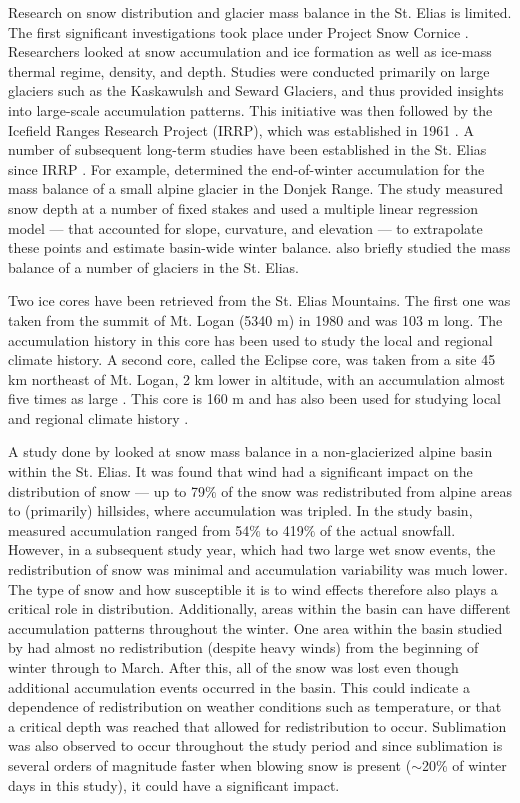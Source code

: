 \documentclass{sfuthesis}
\begin{document}
Research on snow distribution and glacier mass balance in the St. Elias is limited. The first significant investigations took place under Project Snow Cornice \citep{Wood1948}. Researchers looked at snow accumulation and ice formation as well as ice-mass thermal regime, density, and depth. Studies were conducted primarily on large glaciers such as the Kaskawulsh and Seward Glaciers, and thus provided insights into large-scale accumulation patterns. This initiative was then followed by the Icefield Ranges Research Project (IRRP), which was established in 1961 \citep{Danby2003}. A number of subsequent long-term studies have been established in the St. Elias since IRRP \citep[e.g.][]{Clarke1984, Paoli2009}. For example, \cite{Wheler2014} determined the end-of-winter accumulation for the mass balance of a small alpine glacier in the Donjek Range. The study measured snow depth at a number of fixed stakes and used a multiple linear regression model --- that accounted for slope, curvature, and elevation --- to extrapolate these points and estimate basin-wide winter balance. \cite{Arendt2008} also briefly studied the mass balance of a number of glaciers in the St. Elias.

Two ice cores have been retrieved from the St. Elias Mountains. The first one was taken from the summit of Mt. Logan (5340 m) in 1980 and was 103 m long. The accumulation history in this core has been used to study the local \citep{Holdsworth1991} and regional \citep{Moore2002} climate history. A second core, called the Eclipse core, was taken from a site 45 km northeast of Mt. Logan, 2 km lower in altitude, with an accumulation almost five times as large \citep{Wake2002}. This core is 160 m and has also been used for studying local and regional climate history \citep{Wake2002}. 

A study done by \cite{Pomeroy1999} looked at snow mass balance in a non-glacierized alpine basin within the St. Elias. It was found that wind had a significant impact on the distribution of snow --- up to 79$\%$ of the snow was redistributed from alpine areas to (primarily) hillsides, where accumulation was tripled. In the study basin, measured accumulation ranged from 54$\%$ to 419$\%$ of the actual snowfall. However, in a subsequent study year, which had two large wet snow events, the redistribution of snow was minimal and accumulation variability was much lower. The type of snow and how susceptible it is to wind effects therefore also plays a critical role in distribution. Additionally, areas within the basin can have different accumulation patterns throughout the winter. One area within the basin studied by \cite{Pomeroy1999} had almost no redistribution (despite heavy winds) from the beginning of winter through to March. After this, all of the snow was lost even though additional accumulation events occurred in the basin. This could indicate a dependence of redistribution on weather conditions such as temperature, or that a critical depth was reached that allowed for redistribution to occur. Sublimation was also observed to occur throughout the study period and since sublimation is several orders of magnitude faster when blowing snow is present ($\sim$20\% of winter days in this study), it could have a significant impact.
\end{document}
